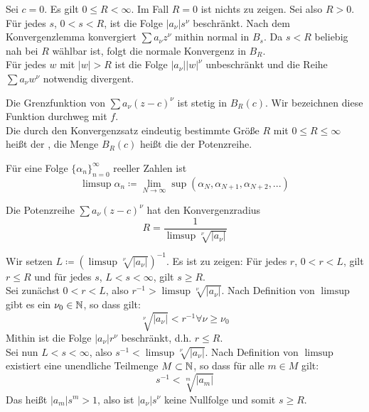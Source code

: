 \begin{beweis}
	Sei $ c=0 $. Es gilt $ 0\leq R<\infty $. Im Fall $ R=0 $ ist nichts zu zeigen. Sei also $ R>0 $. F\"ur jedes $ s $, $ 0<s<R $, ist die Folge $ |a_\nu|s^\nu $ beschr\"ankt. Nach dem Konvergenzlemma konvergiert $ \sum a_\nu z^\nu $ mithin normal in $ B_s $. Da $ s<R $ beliebig nah bei $ R $ w\"ahlbar ist, folgt die normale Konvergenz in $ B_R $.\\
	F\"ur jedes $ w $ mit $ |w|>R $ ist die Folge $ |a_\nu||w|^\nu $ unbeschr\"ankt und die Reihe $ \sum a_\nu w^\nu $ notwendig divergent.
\end{beweis}
\begin{bemerkung*}
	Die Grenzfunktion von $ \sum a_\nu(z-c)^\nu $ ist stetig in $ B_R(c) $. Wir bezeichnen diese Funktion durchweg mit $ f $.\\
	Die durch den Konvergenzsatz eindeutig bestimmte Gr\"o\ss e $ R $ mit $ 0\leq R\leq\infty $ hei\ss t der , die Menge $ B_R(c) $ hei\ss t die  der Potenzreihe. 
\end{bemerkung*}
\begin{definition}
F\"ur eine Folge $ \lbrace\alpha_n\rbrace_{n=0}^\infty $ reeller Zahlen ist
\[ \limsup \alpha_n\coloneqq\lim_{N\to\infty}\sup(\alpha_N,\alpha_{N+1},\alpha_{N+2},...) \]
\end{definition}
\begin{satz}
	Die Potenzreihe $ \sum a_\nu(z-c)^\nu $ hat den Konvergenzradius
	\[ R=\frac{1}{\limsup\sqrt[\nu]{|a_\nu|}} \]
\end{satz}
\begin{beweis}
	Wir setzen $ L\coloneqq(\limsup\sqrt[\nu]{|a_\nu|})^{-1} $. Es ist zu zeigen: F\"ur jedes $ r $, $ 0<r<L $, gilt $ r\leq R $ und f\"ur jedes $ s $, $ L<s<\infty $, gilt $ s\geq R $.\\
	Sei zun\"achst $ 0<r<L $, also $ r^{-1}>\limsup\sqrt[\nu]{|a_\nu|} $. Nach Definition von $ \limsup $ gibt es ein $ \nu_0\in\mathbb{N} $, so dass gilt:
	\[ \sqrt[\nu]{|a_\nu|}<r^{-1}\forall \nu\geq\nu_0 \]
	Mithin ist die Folge $ |a_\nu|r^\nu $ beschr\"ankt, d.h. $ r\leq R $.\\
	Sei nun $ L<s<\infty $, also $ s^{-1}<\limsup\sqrt[\nu]{|a_\nu|} $. Nach Definition von $ \limsup $ existiert eine unendliche Teilmenge $ M\subset\mathbb{N} $, so dass f\"ur alle $ m\in M $ gilt:
	\[ s^{-1}<\sqrt[m]{|a_m|} \]
	Das hei\ss t $ |a_m|s^m>1 $, also ist $ |a_\nu|s^\nu $ keine Nullfolge und somit $ s\geq R $.
\end{beweis}
